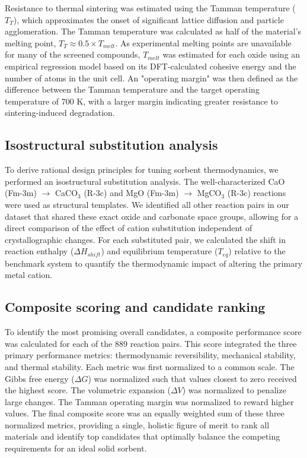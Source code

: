 \documentclass[]{article}
\begin{document}
Resistance to thermal sintering was estimated using the Tamman temperature ($T_T$), which approximates the onset of significant lattice diffusion and particle agglomeration. The Tamman temperature was calculated as half of the material's melting point, $T_T \approx 0.5 \times T_{melt}$. As experimental melting points are unavailable for many of the screened compounds, $T_{melt}$ was estimated for each oxide using an empirical regression model based on its DFT-calculated cohesive energy and the number of atoms in the unit cell. An "operating margin" was then defined as the difference between the Tamman temperature and the target operating temperature of 700 K, with a larger margin indicating greater resistance to sintering-induced degradation.

\subsection{Isostructural substitution analysis}
To derive rational design principles for tuning sorbent thermodynamics, we performed an isostructural substitution analysis. The well-characterized CaO (Fm-3m) $\rightarrow$ CaCO$_3$ (R-3c) and MgO (Fm-3m) $\rightarrow$ MgCO$_3$ (R-3c) reactions were used as structural templates. We identified all other reaction pairs in our dataset that shared these exact oxide and carbonate space groups, allowing for a direct comparison of the effect of cation substitution independent of crystallographic changes. For each substituted pair, we calculated the shift in reaction enthalpy ($\Delta H_{shift}$) and equilibrium temperature ($T_{eq}$) relative to the benchmark system to quantify the thermodynamic impact of altering the primary metal cation.

\subsection{Composite scoring and candidate ranking}
To identify the most promising overall candidates, a composite performance score was calculated for each of the 889 reaction pairs. This score integrated the three primary performance metrics: thermodynamic reversibility, mechanical stability, and thermal stability. Each metric was first normalized to a common scale. The Gibbs free energy ($\Delta G$) was normalized such that values closest to zero received the highest score. The volumetric expansion ($\Delta V$) was normalized to penalize large changes. The Tamman operating margin was normalized to reward higher values. The final composite score was an equally weighted sum of these three normalized metrics, providing a single, holistic figure of merit to rank all materials and identify top candidates that optimally balance the competing requirements for an ideal solid sorbent.
\end{document}
